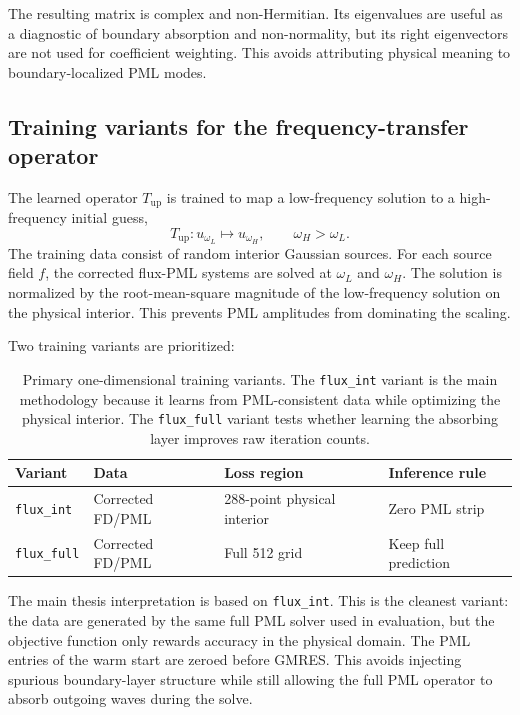 The resulting matrix is complex and non-Hermitian. Its eigenvalues are useful
as a diagnostic of boundary absorption and non-normality, but its right
eigenvectors are not used for coefficient weighting. This avoids attributing
physical meaning to boundary-localized PML modes.


\subsection{Training variants for the frequency-transfer operator}
\label{subsec:methodology_1d_training}

The learned operator $T_{\mathrm{up}}$ is trained to map a low-frequency
solution to a high-frequency initial guess,
\[
    T_{\mathrm{up}} : u_{\omega_L} \mapsto u_{\omega_H},
    \qquad \omega_H > \omega_L.
\]
The training data consist of random interior Gaussian sources. For each source
field $f$, the corrected flux-PML systems are solved at $\omega_L$ and
$\omega_H$. The solution is normalized by the root-mean-square magnitude of
the low-frequency solution on the physical interior. This prevents PML
amplitudes from dominating the scaling.

Two training variants are prioritized:
\begin{table}[h]
\centering
\begin{tabular}{llll}
\toprule
Variant & Data & Loss region & Inference rule \\
\midrule
\texttt{flux\_int} &
Corrected FD/PML &
288-point physical interior &
Zero PML strip \\
\texttt{flux\_full} &
Corrected FD/PML &
Full 512 grid &
Keep full prediction \\
\bottomrule
\end{tabular}
\caption{Primary one-dimensional training variants. The \texttt{flux\_int}
variant is the main methodology because it learns from PML-consistent data
while optimizing the physical interior. The \texttt{flux\_full} variant tests
whether learning the absorbing layer improves raw iteration counts.}
\label{tab:oned_training_variants}
\end{table}

The main thesis interpretation is based on \texttt{flux\_int}. This is the
cleanest variant: the data are generated by the same full PML solver used in
evaluation, but the objective function only rewards accuracy in the physical
domain. The PML entries of the warm start are zeroed before GMRES. This avoids
injecting spurious boundary-layer structure while still allowing the full PML
operator to absorb outgoing waves during the solve.

